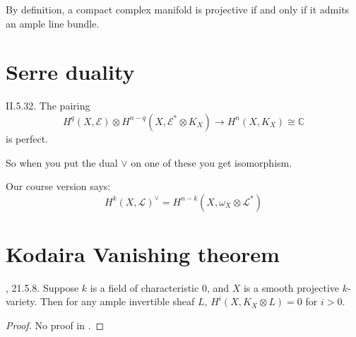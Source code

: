 \begin{slogan}
By definition, a compact complex manifold is projective if and only if it admits
an ample line bundle.
\end{slogan}

\section{Serre duality}
\label{section-serre-duality}

\begin{theorem}
\label{theorem-serre-duality}
\cite{voi} II.5.32. The pairing
$$
H^q(X,\mathcal{E})\otimes
H^{n-q}(X,\mathcal{E}^*\otimes K_X)\to H^{n}(X,K_X)\cong\mathbb{C}
$$
is perfect.
\end{theorem}

So when you put the dual \(\vee\) on one of these you get isomorphism.

Our course version says:
$$
H^{k}(X,\mathcal{L})^{\vee}=H^{n-k}(X,\omega_X \otimes \mathcal{L}^*)
$$
\section{Kodaira Vanishing theorem}
\label{section-Kodaira-vanishing-theorem}

\begin{theorem}[Kodaira]
\label{theorem-Kodaira-vanishing}
\cite{sea}, 21.5.8. Suppose $k$ is a field of characteristic 0, and $X$ is a
smooth projective $k$-variety. Then for any ample invertible sheaf $L$,
$H^{i}(X,K_X \otimes L)=0$ for $i>0$.
\end{theorem}

\begin{proof}
No proof in \cite{sea}.
\end{proof}






